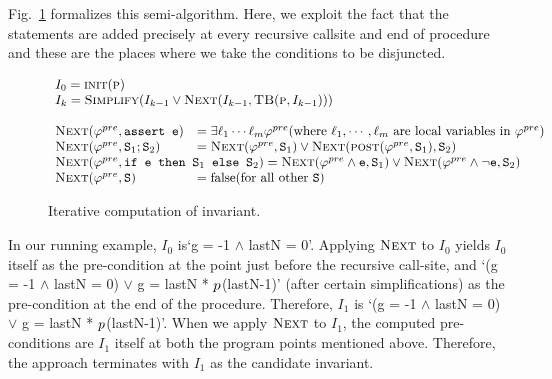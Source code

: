 Fig.~\ref{fig:invgen} formalizes this semi-algorithm. Here, we exploit the fact that the 
statements are added precisely at every recursive callsite and end of procedure and
these are the places where we take the conditions to be disjuncted.
\begin{figure}
\[
\begin{array}{ll}
\multicolumn{2}{l}{I_0 = \initstatefn(\proc)} \\
\multicolumn{2}{l}{I_{k} = \simplifyfn(I_{k-1} \vee \nextfn(I_{k-1}, \tbody(\proc,I_{k-1})))} \\
\\
\nextfn(\pre, \code{assert e}) &= \exists \ell_1 \cdots \ell_m \pre (\text{where $\ell_1, \cdots, \ell_m$ are local variables in $\pre$})\\
\nextfn(\pre, \stmtSA ; \stmtSB) &= \nextfn(\pre, \stmtSA) \vee \nextfn( \postfn(\pre, \stmtSA), \stmtSB) \\
\multicolumn{2}{l}{
\nextfn(\pre, \code{if \expr{} then \stmtSA{} else \stmtSB{}}) = \nextfn(\pre \wedge \expr, \stmtSA) \vee \nextfn(\pre \wedge \neg \expr, \stmtSB)
} \\
\nextfn(\pre, \stmt) &= \text{false} (\text{for all other \stmt})
\end{array}
\]
\caption{Iterative computation of invariant.}
\label{fig:invgen}
\end{figure}

In our running example, $I_0$  is`g = -1 $\wedge$ lastN = 0'.
Applying $\textsc{Next}$ to $I_0$
yields $I_0$ itself as the pre-condition at the
point just before the recursive call-site, and `(g = -1 $\wedge$ lastN = 0) $\vee$ g = lastN *
$p$(lastN-1)' (after certain simplifications) as the pre-condition
at the end of the
procedure. Therefore, $I_1$ is `(g = -1 $\wedge$ lastN = 0) $\vee$ g = lastN *
$p$(lastN-1)'. When we apply $\textsc{Next}$ to $I_1$,
the computed pre-conditions are $I_1$ itself at both the program points
mentioned above. Therefore, the approach terminates with $I_1$ as the
candidate invariant.

